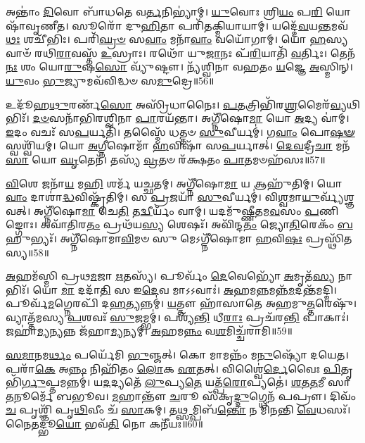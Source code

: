 𑌅𑌨𑍍𑌤𑌾𑌂॑ \ul{𑌦𑌿}\-𑌵𑍋 𑌬𑌾᳴𑌧𑌤𑍇 𑌵\-\ul{𑌰𑍍𑌤}\-𑌨𑌿𑌭𑍍𑌯𑌾॑𑌮𑍍।
\-\ul{𑌯𑍁}\-𑌵𑍋𑌃 𑌶𑍍𑌰𑌿\-\ul{𑌯𑌂} 𑌪\-\ul{𑌰𑌿} 𑌯𑍋𑌷𑌾᳴𑌵𑍃𑌣𑍀𑌤।
𑌸𑍂𑌰𑍋᳴ 𑌦𑍁\-\ul{𑌹𑌿}\-𑌤𑌾 𑌪𑌰𑌿᳴𑌤𑌕𑍍𑌮𑌿𑌯𑌾𑌯𑌾𑌮𑍍।
𑌯𑌦𑍍𑌦𑍇᳴\-\ul{𑌵}\-𑌯\-\ul{𑌨𑍍𑌤}\-𑌮𑌵᳴\-\ul{𑌥𑌃} 𑌶𑌚𑍀᳴𑌭𑌿𑌃।
𑌪𑌰𑌿᳴\-\ul{𑌘𑍍𑌰}\-\-\ul{𑍞} 𑌸\-\ul{𑌵𑌾𑌂} 𑌮𑌨𑌾᳴\-\ul{𑌵𑌾𑌂} 𑌵𑌯𑍋᳴𑌗𑌾𑌮𑍍।
𑌯𑍋 \ul{𑌹}\-𑌸𑍍𑌯𑌵𑌾𑍞᳴ 𑌰𑌥𑌿\-\ul{𑌰𑌾}\-𑌵𑌸𑍍𑌤᳴ \ul{𑌉}\-𑌸𑍍𑌰𑌾𑌃।
𑌰𑌥𑍋᳴ 𑌯𑍁\-\ul{𑌜𑌾}\-𑌨𑌃 𑌪᳴\-\ul{𑌰𑌿}\-𑌯𑌾𑌤𑌿᳴ \ul{𑌵}\-𑌰𑍍𑌤𑌿𑌃।
𑌤𑍇𑌨᳴ \ul{𑌨𑌃} 𑌶𑌂 𑌯𑍋\-\ul{𑌰𑍁}\-𑌷\-\ul{𑌸𑍋} 𑌵𑍍𑌯𑍁᳴𑌷𑍍𑌟𑍗।
𑌨𑍍𑌯᳴𑌶𑍍𑌵𑌿𑌨𑌾 𑌵𑌹𑌤𑌂 \ul{𑌯}\-𑌜𑍍𑌞𑍇 \ul{𑌅}\-𑌸𑍍𑌮𑌿𑌨𑍍।
\-\ul{𑌯𑍁}\-𑌵𑌂 \ul{𑌭𑍁}\-𑌜𑍍𑌯𑍁𑌮𑌵᳴𑌵𑌿𑌦𑍍𑌧𑍞 𑌸\-\ul{𑌮𑍁}\-𑌦𑍍𑌰𑍇॥56॥

𑌉𑌦𑍂᳴𑌹\-\ul{𑌥𑍁}\-𑌰𑌰𑍍𑌣᳴\-\ul{𑌸𑍋} 𑌅𑌸𑍍𑌰𑌿᳴𑌧𑌾𑌨𑍈𑌃।
\-\ul{𑌪}\-\-\ul{𑌤}\-𑌤𑍍𑌰𑌿𑌭𑌿᳴𑌰\-\ul{𑌶𑍍𑌰}\-𑌮𑍈𑌰᳴\-\ul{𑌵𑍍𑌯}\-𑌥𑌿𑌭𑌿𑌃᳴।
\-\ul{𑌦}\-\-\ul{𑍞}\-𑌸𑌨𑌾᳴𑌭𑌿𑌰𑌶𑍍𑌵𑌿𑌨𑌾 \ul{𑌪𑌾}\-𑌰𑌯᳴𑌨𑍍𑌤𑌾।
𑌅𑌗𑍍𑌨𑍀᳴𑌷𑍋\-\ul{𑌮𑌾} 𑌯𑍋 \ul{𑌅}\-𑌦𑍍𑌯 𑌵𑌾॑𑌮𑍍।
\-\ul{𑌇}\-𑌦𑌂 𑌵𑌚𑌃᳴ 𑌸\-\ul{𑌪}\-𑌰𑍍𑌯𑌤𑌿᳴।
𑌤𑌸𑍍𑌮𑍈᳴ 𑌧𑌤𑍍𑌤𑍞 \ul{𑌸𑍁}\-𑌵𑍀𑌰𑍍𑌯𑌮𑍍॑।
𑌗\-\ul{𑌵𑌾𑌂} 𑌪𑍋\-\ul{𑌷}\-\-\ul{𑍟} 𑌸𑍍𑌵𑌶𑍍𑌵𑌿᳴𑌯𑌮𑍍।
𑌯𑍋 \ul{𑌅}\-𑌗𑍍𑌨𑍀𑌷𑍋𑌮𑌾᳴ \ul{𑌹}\-𑌵𑌿𑌷𑌾᳴ 𑌸\-\ul{𑌪}\-𑌰𑍍𑌯𑌾𑌤𑍍।
\-\ul{𑌦𑍇}\-\-\ul{𑌵}\-𑌦𑍍𑌰𑍀\-\ul{𑌚𑌾} 𑌮𑌨᳴\-\ul{𑌸𑌾} 𑌯𑍋 \ul{𑌘𑍃}\-𑌤𑍇𑌨᳴।
𑌤𑌸𑍍𑌯᳴ \ul{𑌵𑍍𑌰}\-𑌤𑍞 𑌰᳴𑌕𑍍𑌷𑌤𑌂 \ul{𑌪𑌾}\-𑌤𑌮𑍞𑌹᳴𑌸𑌃॥57॥

\-\ul{𑌵𑌿}\-𑌶𑍇 𑌜𑌨𑌾᳴\-\ul{𑌯} 𑌮\-\ul{𑌹𑌿} 𑌶𑌰𑍍𑌮᳴ 𑌯𑌚𑍍𑌛𑌤𑌮𑍍।
𑌅𑌗𑍍𑌨𑍀᳴𑌷𑍋\-\ul{𑌮𑌾} 𑌯 𑌆𑌹𑍁᳴𑌤𑌿𑌮𑍍।
𑌯𑍋 \ul{𑌵𑌾𑌂} 𑌦𑌾𑌶𑌾॑\-\ul{𑌦𑍍𑌧}\-𑌵𑌿𑌷𑍍𑌕𑍃᳴𑌤𑌿𑌮𑍍।
𑌸 \ul{𑌪𑍍𑌰}\-𑌜𑌯𑌾᳴ \ul{𑌸𑍁}\-𑌵𑍀𑌰𑍍𑌯𑌮𑍍॑।
𑌵𑌿\-\ul{𑌶𑍍𑌵}\-𑌮𑌾\-\ul{𑌯𑍁}\-𑌰𑍍𑌵𑍍𑌯᳴𑌶𑍍𑌞𑌵𑌤𑍍।
𑌅𑌗𑍍𑌨𑍀᳴𑌷𑍋\-\ul{𑌮𑌾} 𑌚𑍇\-\ul{𑌤𑌿} 𑌤\-\ul{𑌦𑍍𑌵𑍀}\-𑌰𑍍𑌯𑌂᳴ 𑌵𑌾𑌮𑍍।
𑌯𑌦𑌮𑍁᳴𑌷𑍍𑌣𑍀𑌤𑌮\-\ul{𑌵}\-𑌸𑌂 \ul{𑌪}\-𑌣𑌿𑌙𑍍𑌗𑍋𑌃।
𑌅𑌵𑌾᳴𑌤𑌿𑌰\-\ul{𑌤𑌂} 𑌪𑍍𑌰𑌥᳴𑌯\-\ul{𑌸𑍍𑌯} 𑌶𑍇𑌷𑌃᳴।
𑌅𑌵𑌿᳴𑌨𑍍𑌦\-\ul{𑌤𑌂} 𑌜𑍍𑌯𑍋\-\ul{𑌤𑌿}\-𑌰𑍇𑌕𑌂᳴ \ul{𑌬}\-𑌹𑍁𑌭𑍍𑌯𑌃᳴।
𑌅𑌗𑍍𑌨𑍀᳴𑌷𑍋𑌮𑌾\-\ul{𑌵𑌿}\-𑌮𑍞 𑌸𑍁 𑌮𑍇𑌽𑌗𑍍𑌨𑍀᳴𑌷𑍋𑌮𑌾 \ul{𑌹}\-𑌵𑌿\-\ul{𑌷𑌃} 𑌪𑍍𑌰𑌸𑍍𑌥𑌿᳴𑌤𑌸𑍍𑌯॥58॥\anuvakamend[\-\ul{𑌜}\-\-\ul{𑌭𑌾}\-\-\ul{𑌰} 𑌦𑍍𑌯𑍗\-\ul{𑌰}\-𑌗𑍍𑌨𑍇\-\ul{𑌰𑍁}\-𑌪𑌸𑍍𑌥᳴ 𑌉\-\ul{𑌪}\-𑌕𑍍𑌷𑍍𑌯𑌨𑍍𑌤𑍋᳴ 𑌬𑌦𑍍𑌬\-\ul{𑌧𑌾}\-𑌨𑍋 \ul{𑌵}\-𑌧𑍍𑌵𑌾᳴ 𑌯𑌾𑌦᳴𑌮𑌾𑌨𑌃 𑌸\-\ul{𑌮𑍁}\-𑌦𑍍𑌰𑍇\-𑌽𑍞𑌹᳴\-\ul{𑌸𑌃} 𑌪𑍍𑌰𑌸𑍍𑌥𑌿᳴𑌤𑌸𑍍𑌯]

\-\ul{𑌅}\-𑌹𑌮᳴𑌸𑍍𑌮𑌿 𑌪𑍍𑌰𑌥\-\ul{𑌮}\-𑌜𑌾 \ul{𑌋}\-𑌤𑌸𑍍𑌯᳴।
𑌪𑍂𑌰𑍍𑌵𑌂᳴ \ul{𑌦𑍇}\-𑌵𑍇𑌭𑍍𑌯𑍋᳴ \ul{𑌅}\-𑌮𑍃𑌤᳴\-\ul{𑌸𑍍𑌯} 𑌨𑌾𑌭𑌿𑌃᳴।
𑌯𑍋 \ul{𑌮𑌾} 𑌦𑌦𑌾᳴\-\ul{𑌤𑌿} 𑌸 𑌇\-\ul{𑌦𑍇}\-𑌵 𑌮𑌾𑌽𑌽𑌵𑌾𑌃॑।
\-\ul{𑌅}\-𑌹𑌮\-\ul{𑌨𑍍𑌨}\-𑌮𑌨𑍍𑌨᳴\-\-\ul{𑌮}\-𑌦𑌨𑍍𑌤᳴\-𑌮𑌦𑍍𑌮𑌿।
𑌪𑍂𑌰𑍍𑌵᳴\-\ul{𑌮}\-𑌗𑍍𑌨𑍇𑌰𑌪𑌿᳴ 𑌦\-\ul{𑌹}\-𑌤𑍍𑌯𑌨𑍍𑌨𑌮𑍍॑।
\-\ul{𑌯}\-𑌤𑍍𑌤𑍗 𑌹𑌾᳴𑌸𑌾𑌤𑍇 𑌅𑌹𑌮𑍁\-\ul{𑌤𑍍𑌤}\-𑌰𑍇𑌷𑍁᳴।
𑌵𑍍𑌯𑌾𑌤𑍍𑌤᳴𑌮𑌸𑍍𑌯 \ul{𑌪}\-𑌶𑌵𑌃᳴ \ul{𑌸𑍁}\-𑌜𑌮𑍍𑌭𑌮𑍍॑।
𑌪𑌶𑍍𑌯᳴\-\ul{𑌨𑍍𑌤𑌿} 𑌧𑍀\-\ul{𑌰𑌾𑌃} 𑌪𑍍𑌰𑌚᳴𑌰\-\ul{𑌨𑍍𑌤𑌿} 𑌪𑌾𑌕𑌾𑌃॑।
𑌜𑌹𑌾॑\-\ul{𑌮𑍍𑌯}\-𑌨𑍍𑌯𑌨𑍍𑌨 𑌜᳴𑌹𑌾\-\ul{𑌮𑍍𑌯}\-𑌨𑍍𑌯𑌮𑍍।
\-\ul{𑌅}\-𑌹𑌮\-\ul{𑌨𑍍𑌨𑌂} 𑌵\-\ul{𑌶}\-𑌮𑌿𑌚𑍍𑌚᳴𑌰𑌾𑌮𑌿॥59॥

\-\ul{𑌸}\-\-\ul{𑌮𑌾}\-𑌨𑌮\-\ul{𑌰𑍍𑌥𑌂} 𑌪𑌰𑍍𑌯𑍇᳴𑌮𑌿 \ul{𑌭𑍁}\-𑌞𑍍𑌜𑌤𑍍।
𑌕𑍋 𑌮𑌾𑌮𑌨𑍍𑌨𑌂᳴ 𑌮\-\ul{𑌨𑍁}\-𑌷𑍍𑌯𑍋᳴ 𑌦𑌯𑍇𑌤।
𑌪𑌰𑌾᳴\-\ul{𑌕𑍇} 𑌅\-\ul{𑌨𑍍𑌨𑌂} 𑌨𑌿𑌹𑌿᳴𑌤𑌂 \ul{𑌲𑍋}\-𑌕 \ul{𑌏}\-𑌤𑌤𑍍।
𑌵𑌿𑌶𑍍𑌵𑍈॑\-\ul{𑌰𑍍𑌦𑍇}\-𑌵𑍈𑌃 \ul{𑌪𑌿}\-𑌤𑍃𑌭𑌿᳴\-\ul{𑌰𑍍𑌗𑍁}\-𑌪𑍍𑌤𑌮𑌨𑍍𑌨𑌮𑍍॑।
𑌯\-\ul{𑌦}\-𑌦𑍍𑌯𑌤𑍇᳴ \ul{𑌲𑍁}\-𑌪𑍍𑌯\-\ul{𑌤𑍇} 𑌯𑌤𑍍𑌪᳴\-\ul{𑌰𑍋}\-𑌪𑍍𑌯𑌤𑍇॑।
\-\ul{𑌶}\-\-\ul{𑌤}\-\-\ul{𑌤}\-𑌮𑍀 𑌸𑌾 \ul{𑌤}\-𑌨𑍂𑌰𑍍𑌮𑍇᳴ 𑌬𑌭𑍂𑌵।
\-\ul{𑌮}\-𑌹𑌾𑌨𑍍𑌤𑍗᳴ \ul{𑌚}\-𑌰𑍂 𑌸᳴𑌕𑍃\-\ul{𑌦𑍍𑌦𑍁}\-𑌗𑍍𑌧𑍇𑌨᳴ 𑌪𑌪𑍍𑌰𑍗।
𑌦𑌿𑌵𑌂᳴ \ul{𑌚} 𑌪𑍃𑌶𑍍𑌞𑌿᳴ 𑌪𑍃\-\ul{𑌥𑌿}\-𑌵𑍀𑌂 𑌚᳴ \ul{𑌸𑌾}\-𑌕𑌮𑍍।
𑌤\-\ul{𑌥𑍍𑌸}\-𑌮𑍍𑌪𑌿𑌬᳴\-\ul{𑌨𑍍𑌤𑍋} 𑌨 𑌮𑌿᳴𑌨𑌨𑍍𑌤𑌿 \ul{𑌵𑍇}\-𑌧𑌸𑌃᳴।
𑌨𑍈𑌤𑌦𑍍𑌭𑍂\-\ul{𑌯𑍋} 𑌭𑌵᳴\-\ul{𑌤𑌿} 𑌨𑍋 𑌕𑌨𑍀᳴𑌯𑌃॥60॥

